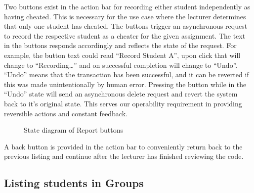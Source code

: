 \documentclass[11pt,a4paper]{article}
\begin{document}
Two buttons exist in the action bar for recording either student independently as having cheated. This is necessary for the use case where the lecturer determines that only one student has cheated. The buttons trigger an asynchronous request to record the respective student as a cheater for the given assignment. The text in the buttons responds accordingly and reflects the state of the request. For example, the button text could read “Record Student A”, upon click that will change to “Recording…” and on successful completion will change to “Undo”. “Undo” means that the transaction has been successful, and it can be reverted if this was made unintentionally by human error. Pressing the button while in the “Undo” state will send an asynchronous delete request and revert the system back to it’s original state. This serves our operability requirement in providing reversible actions and constant feedback.

\begin{figure}[H]
  \caption{State diagram of Report buttons}
  \label{fig:statediagram}
\end{figure}


A back button is provided in the action bar to conveniently return back to the previous listing and continue after the lecturer has finished reviewing the code.

\subsection{Listing students in Groups}
\end{document}
